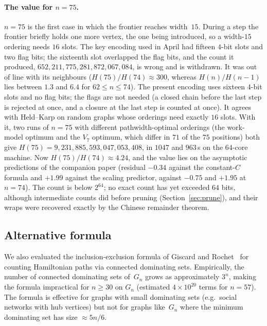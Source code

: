 \documentclass[12pt]{article}
\theoremstyle{definition}
\newcommand{\Gn}{G_n}
\begin{document}
\paragraph{The value for $n=75$.}
$n=75$ is the first case in which the frontier reaches width~$15$.
During a step the frontier briefly holds one more vertex, the one being
introduced, so a width-$15$ ordering needs $16$ slots.
The key encoding used in April had fifteen $4$-bit slots and two flag bits;
the sixteenth slot overlapped the flag bits, and the count it produced,
$652{,}211{,}775{,}281{,}872{,}067{,}084$, is wrong and is withdrawn.
It was out of line with its neighbours ($H(75)/H(74)\approx300$, whereas
$H(n)/H(n-1)$ lies between $1.3$ and $6.4$ for $62\le n\le74$).
The present encoding uses sixteen $4$-bit slots and no flag bits; the flags
are not needed (a closed chain before the last step is rejected at once, and
a closure at the last step is counted at once).
It agrees with Held--Karp on random graphs whose orderings need exactly
$16$ slots.
With it, two runs of $n=75$ with different pathwidth-optimal orderings
(the work-model optimum and the $V_7$ optimum, which differ in $71$ of the
$75$ positions) both give $H(75)=9{,}231{,}885{,}593{,}047{,}053{,}408$,
in $1047$ and $963$\,s on the $64$-core machine.
Now $H(75)/H(74)\approx4.24$, and the value lies on the asymptotic predictions
of the companion paper (residual $-0.34$ against the constant-$C$ formula and
$+1.99$ against the scaling predictor, against $-0.75$ and $+1.95$ at $n=74$).
The count is below $2^{64}$; no exact count has yet exceeded $64$ bits, although
intermediate counts did before pruning (Section~\ref{sec:prune}), and their
wraps were recovered exactly by the Chinese remainder theorem.

\subsection{Alternative formula}

We also evaluated the inclusion-exclusion formula of Giscard and
Rochet~\cite{GiscardRochet} for counting Hamiltonian paths via connected
dominating sets.
Empirically, the number of connected dominating sets of~$\Gn$ grows as
approximately $3^n$, making the formula impractical for $n \ge 30$ on
$\Gn$ (estimated $4 \times 10^{20}$ terms for $n = 57$).
The formula is effective for graphs with small dominating sets (e.g.\ social
networks with hub vertices) but not for graphs like~$\Gn$ where the minimum
dominating set has size $\approx 5n/6$.
\end{document}
